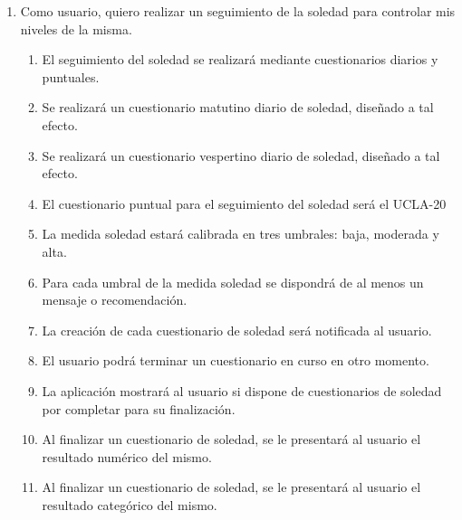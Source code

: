         \begin{enumerate}[resume=req-usuario,label=\textbf{\texttt{RU-\arabic*}}]
            \item Como usuario, quiero realizar un seguimiento de la soledad para controlar mis niveles de la misma.
            \begin{enumerate}[resume=req-funcionales,label=\textbf{\texttt{RF-\arabic*}}]
                \item El seguimiento del soledad se realizará mediante cuestionarios diarios y puntuales.
                \item Se realizará un cuestionario matutino diario de soledad, diseñado a tal efecto.
                \item Se realizará un cuestionario vespertino diario de soledad, diseñado a tal efecto.
                \item El cuestionario puntual para el seguimiento del soledad será el UCLA-20
                \item La medida soledad estará calibrada en tres umbrales: baja, moderada y alta.
                \item Para cada umbral de la medida soledad se dispondrá de al menos un mensaje o recomendación.
                \item La creación de cada cuestionario de soledad será notificada al usuario.
                \item El usuario podrá terminar un cuestionario en curso en otro momento.
                \item La aplicación mostrará al usuario si dispone de cuestionarios de soledad por completar para su finalización.
                \item Al finalizar un cuestionario de soledad, se le presentará al usuario el resultado numérico del mismo.
                \item Al finalizar un cuestionario de soledad, se le presentará al usuario el resultado categórico del mismo.
            \end{enumerate}
        \end{enumerate}
